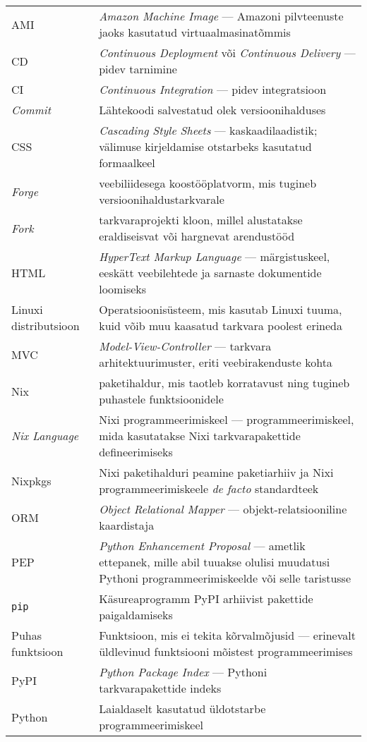 \begin{longtable}{p{4cm}p{10cm}}
AMI&\textit{Amazon Machine Image} — Amazoni pilvteenuste jaoks kasutatud virtuaalmasinatõmmis\\
CD&\textit{Continuous Deployment} või \textit{Continuous Delivery} — pidev tarnimine\\
CI&\textit{Continuous Integration} — pidev integratsioon\\
\textit{Commit}&Lähtekoodi salvestatud olek versioonihalduses\\
CSS&\textit{Cascading Style Sheets} — kaskaadilaadistik; välimuse kirjeldamise otstarbeks kasutatud formaalkeel\\
\textit{Forge}&veebiliidesega koostööplatvorm, mis tugineb versioonihaldustarkvarale\\
\textit{Fork}&tarkvaraprojekti kloon, millel alustatakse eraldiseisvat või hargnevat arendustööd\\
HTML&\textit{HyperText Markup Language} — märgistuskeel, eeskätt veebilehtede ja sarnaste dokumentide loomiseks\\
Linuxi distributsioon&Operatsioonisüsteem, mis kasutab Linuxi tuuma, kuid võib muu kaasatud tarkvara poolest erineda\\
MVC&\textit{Model-View-Controller} — tarkvara arhitektuurimuster, eriti veebirakenduste kohta\\
Nix&paketihaldur, mis taotleb korratavust ning tugineb puhastele funktsioonidele\\
\textit{Nix Language}& Nixi programmeerimiskeel — programmeerimiskeel, mida kasutatakse Nixi tarkvarapakettide defineerimiseks\\
Nixpkgs&Nixi paketihalduri peamine paketiarhiiv ja Nixi programmeerimiskeele \textit{de facto} standardteek\\
ORM&\emph{Object Relational Mapper} — objekt-relatsiooniline kaardistaja\\
PEP&\textit{Python Enhancement Proposal} — ametlik ettepanek, mille abil tuuakse olulisi muudatusi Pythoni programmeerimiskeelde või selle taristusse\\
\texttt{pip}&Käsureaprogramm PyPI arhiivist pakettide paigaldamiseks\\
Puhas funktsioon&Funktsioon, mis ei tekita kõrvalmõjusid — erinevalt üldlevinud funktsiooni mõistest programmeerimises\\
PyPI&\textit{Python Package Index} — Pythoni tarkvarapakettide indeks\\
Python&Laialdaselt kasutatud üldotstarbe programmeerimiskeel\\
\end{longtable}
\addtocounter{table}{-1} 

